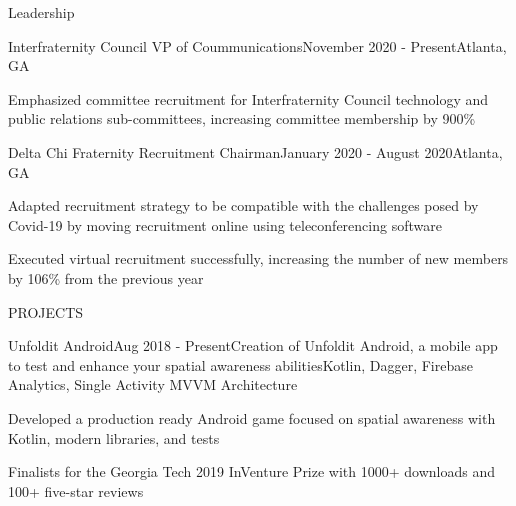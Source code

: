 \documentclass{resume}
\begin{document}
\begin{rSection}{Leadership}

	\begin{rSubsection}{Interfraternity Council VP of Coummunications}{November 2020 - Present}{}{}{Atlanta, GA}
		\item Emphasized committee recruitment for Interfraternity Council technology and public relations sub-committees, increasing committee membership by 900\%
	\end{rSubsection}

	\begin{rSubsection}{Delta Chi Fraternity Recruitment Chairman}{January 2020 - August 2020}{}{}{Atlanta, GA}
		\item Adapted recruitment strategy to be compatible with the challenges posed by Covid-19 by moving recruitment online using teleconferencing software
		\item Executed virtual recruitment successfully, increasing the number of new members by 106\% from the previous year
	\end{rSubsection}

\end{rSection}

\begin{rSectionProjects}{PROJECTS}{}
	
	\begin{rSubsectionProjects}{Unfoldit Android}{Aug 2018 - Present}{Creation of Unfoldit Android, a mobile app to test and enhance your spatial awareness abilities}{Kotlin, Dagger, Firebase Analytics, Single Activity MVVM Architecture}
		\item Developed a production ready Android game focused on spatial awareness with Kotlin, modern libraries, and tests
		\item Finalists for the Georgia Tech 2019 InVenture Prize with 1000+ downloads and 100+ five-star reviews
	\end{rSubsectionProjects} 

\end{rSectionProjects} 
\end{document}
